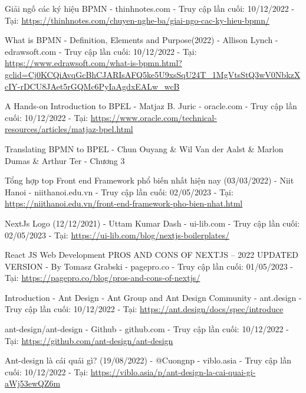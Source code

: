 
\begin{thebibliography}{9}
    Giải ngố các ký hiệu BPMN - thinhnotes.com - Truy cập lần cuối: 10/12/2022 - Tại: \url{https://thinhnotes.com/chuyen-nghe-ba/giai-ngo-cac-ky-hieu-bpmn/}

    What is BPMN - Definition, Elements and Purpose(2022) - Allison Lynch - edrawsoft.com - Truy cập lần cuối: 10/12/2022 - Tại: \url{https://www.edrawsoft.com/what-is-bpmn.html?gclid=Cj0KCQiAvqGcBhCJARIsAFQ5ke5U9xsSqU24T_1MgVtsStQ3wV0NbkzXcIY-rDCU8JAet5rGQMc6PyIaAgdxEALw_wcB}

    A Hands-on Introduction to BPEL - Matjaz B. Juric - oracle.com - Truy cập lần cuối: 10/12/2022 - Tại: \url{https://www.oracle.com/technical-resources/articles/matjaz-bpel.html}

    Translating BPMN to BPEL - Chun Ouyang \& Wil Van der Aalst \& Marlon Dumas \& Arthur Ter - Chương 3

    Tổng hợp top Front end Framework phổ biến nhất hiện nay (03/03/2022) - Niit Hanoi - niithanoi.edu.vn
    - Truy cập lần cuối: 02/05/2023 - Tại: \url{https://niithanoi.edu.vn/front-end-framework-pho-bien-nhat.html}

    NextJs Logo (12/12/2021) - Uttam Kumar Dash - ui-lib.com
    - Truy cập lần cuối: 02/05/2023 - Tại: \url{https://ui-lib.com/blog/nextjs-boilerplates/}


    React JS Web Development PROS AND CONS OF NEXTJS – 2022 UPDATED VERSION - By Tomasz Grabski - pagepro.co - Truy cập lần cuối: 01/05/2023 - Tại: \url{https://pagepro.co/blog/pros-and-cons-of-nextjs/}

    Introduction - Ant Design - Ant Group and Ant Design Community - ant.design - Truy cập lần cuối: 10/12/2022 - Tại: \url{https://ant.design/docs/spec/introduce}

    ant-design/ant-design - Github - github.com - Truy cập lần cuối: 10/12/2022 - Tại: \url{https://github.com/ant-design/ant-design}

    Ant-design là cái quái gì? (19/08/2022) - @Cuongnp - viblo.asia - Truy cập lần cuối: 10/12/2022 - Tại: \url{https://viblo.asia/p/ant-design-la-cai-quai-gi-aWj53ewQZ6m}



\end{thebibliography}
